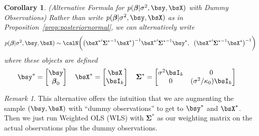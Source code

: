 \documentclass[12pt]{article}
\theoremstyle{plain}
\newtheorem{cor}[thm]{Corollary}
\theoremstyle{definition}
\theoremstyle{remark}
\newtheorem*{rmk}{Remark}
\newcommand{\bsSigma}{\boldsymbol{\Sigma}}
\newcommand{\bsbeta}{\boldsymbol{\beta}}
\begin{document}
\begin{cor}
\emph{(Alternative Formula for $p(\bsbeta|\sigma^2,\bsy,\bsX)$ with
Dummy Observations)}
Rather than write $p(\bsbeta|\sigma^2,\bsy,\bsX)$ as in
Proposition~\ref{prop:posteriornormal}, we can alternatively write
\begin{align*}
  p(\bsbeta | \sigma^2, \bsy, \bsX)
  \sim
  \calN\bigg(
  \big(
  {\bsX^*}'
  {\bsSigma^*}^{-1}
  \bsX^*
  \big)^{-1}
  {\bsX^*}'{\bsSigma^*}^{-1} \bsy^*,\;\;
  \big(
  {\bsX^*}'
  {\bsSigma^*}^{-1}
  \bsX^*
  \big)^{-1}
  \bigg)
\end{align*}
where these objects are defined
\begin{align*}
  \bsy^*=
  \begin{bmatrix}
    \bsy \\ \bsbeta_0
  \end{bmatrix}
  \quad
  \bsX^*=
  \begin{bmatrix}
    \bsX \\ \bsI_k
  \end{bmatrix}
  \quad
  \bsSigma^*=
  \begin{bmatrix}
    \sigma^2\bsI_k & 0 \\
    0 &  (\sigma^2/\kappa_0)\bsI_k
  \end{bmatrix}
  \quad
\end{align*}
\end{cor}
\begin{rmk}
This alternative offers the intuition that we are augmenting the sample
$(\bsy,\bsX)$ with ``dummy observations'' to get to $\bsy^*$ and
$\bsX^*$. Then we just run Weighted OLS (WLS) with $\bsSigma^*$ as our
weighting matrix on the actual observations plus the dummy observations.
\end{rmk}
\end{document}
